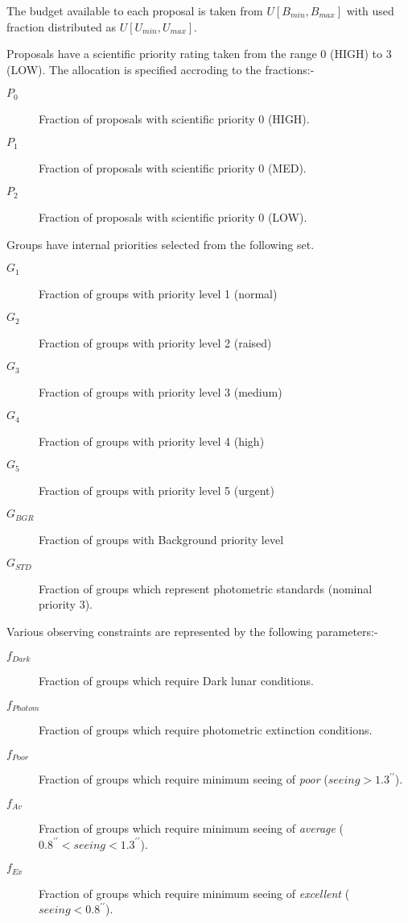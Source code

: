 The budget available to each proposal is taken from $U[B_{min}, B_{max}]$ with used fraction distributed as $U[U_{min}, U_{max}]$.

Proposals have a scientific priority rating taken from the range 0 (HIGH) to 3 (LOW). The allocation is specified accroding to the fractions:-
\begin{description}
\item [$P_0$] Fraction of proposals with scientific priority 0 (HIGH).
\item [$P_1$] Fraction of proposals with scientific priority 0 (MED).
\item [$P_2$] Fraction of proposals with scientific priority 0 (LOW).
\end{description}

Groups have internal priorities selected from the following set.
\begin{description}
\item [$G_1$] Fraction of groups with priority level 1 (normal)
\item [$G_2$] Fraction of groups with priority level 2 (raised)
\item [$G_3$] Fraction of groups with priority level 3 (medium)
\item [$G_4$] Fraction of groups with priority level 4 (high)
\item [$G_5$] Fraction of groups with priority level 5 (urgent)
\item [$G_{BGR}$] Fraction of groups with Background priority level
\item [$G_{STD}$] Fraction of groups which represent photometric standards (nominal priority 3).
\end{description}

Various observing constraints are represented by the following parameters:-
\begin{description}
\item [$f_{Dark}$] Fraction of groups which require Dark lunar conditions.
\item [$f_{Photom}$] Fraction of groups which require photometric extinction conditions.
\item [$f_{Poor}$] Fraction of groups which require minimum seeing of \emph{poor} ($ seeing > 1.3^{\prime\prime}$).
\item [$f_{Av}$] Fraction of groups which require minimum seeing of \emph{average} ($ 0.8^{\prime\prime} < seeing < 1.3^{\prime\prime} $).
\item [$f_{Ex}$] Fraction of groups which require minimum seeing of \emph{excellent} ($ seeing < 0.8^{\prime\prime}$).
\end{description}


 
 

